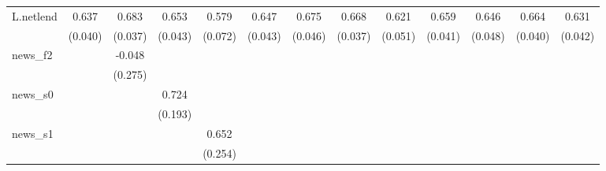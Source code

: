 {\begin{tabular}{l*{12}{c}}
\addlinespace
L.netlend   &       0.637\sym{***}&       0.683\sym{***}&       0.653\sym{***}&       0.579\sym{***}&       0.647\sym{***}&       0.675\sym{***}&       0.668\sym{***}&       0.621\sym{***}&       0.659\sym{***}&       0.646\sym{***}&       0.664\sym{***}&       0.631\sym{***}\\
            &     (0.040)         &     (0.037)         &     (0.043)         &     (0.072)         &     (0.043)         &     (0.046)         &     (0.037)         &     (0.051)         &     (0.041)         &     (0.048)         &     (0.040)         &     (0.042)         \\
\addlinespace
news\_f2     &                     &      -0.048         &                     &                     &                     &                     &                     &                     &                     &                     &                     &                     \\
            &                     &     (0.275)         &                     &                     &                     &                     &                     &                     &                     &                     &                     &                     \\
\addlinespace
news\_s0     &                     &                     &       0.724\sym{***}&                     &                     &                     &                     &                     &                     &                     &                     &                     \\
            &                     &                     &     (0.193)         &                     &                     &                     &                     &                     &                     &                     &                     &                     \\
\addlinespace
news\_s1     &                     &                     &                     &       0.652\sym{**} &                     &                     &                     &                     &                     &                     &                     &                     \\
            &                     &                     &                     &     (0.254)         &                     &                     &                     &                     &                     &                     &                     &                     \\

\end{tabular}}
